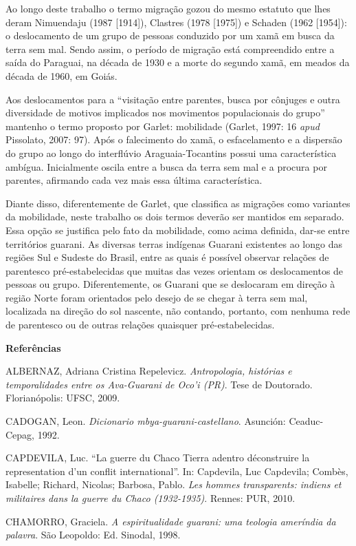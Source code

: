 Ao longo deste trabalho o termo migração gozou do mesmo estatuto que
lhes deram Nimuendaju (1987 {[}1914{]}), Clastres (1978 {[}1975{]}) e
Schaden (1962 {[}1954{]}): o deslocamento de um grupo de pessoas
conduzido por um xamã em busca da terra sem mal. Sendo assim, o período
de migração está compreendido entre a saída do Paraguai, na década de
1930 e a morte do segundo xamã, em meados da década de 1960, em Goiás.

Aos deslocamentos para a ``visitação entre parentes, busca por cônjuges
e outra diversidade de motivos implicados nos movimentos populacionais
do grupo'' mantenho o termo proposto por Garlet: mobilidade (Garlet,
1997: 16 \emph{apud} Pissolato, 2007: 97). Após o falecimento do xamã, o
esfacelamento e a dispersão do grupo ao longo do interflúvio
Araguaia-Tocantins possui uma característica ambígua. Inicialmente
oscila entre a busca da terra sem mal e a procura por parentes,
afirmando cada vez mais essa última característica.

Diante disso, diferentemente de Garlet, que classifica as migrações como
variantes da mobilidade, neste trabalho os dois termos deverão ser
mantidos em separado. Essa opção se justifica pelo fato da mobilidade,
como acima definida, dar-se entre territórios guarani. As diversas
terras indígenas Guarani existentes ao longo das regiões Sul e Sudeste
do Brasil, entre as quais é possível observar relações de parentesco
pré-estabelecidas que muitas das vezes orientam os deslocamentos de
pessoas ou grupo. Diferentemente, os Guarani que se deslocaram em
direção à região Norte foram orientados pelo desejo de se chegar à terra
sem mal, localizada na direção do sol nascente, não contando, portanto,
com nenhuma rede de parentesco ou de outras relações quaisquer
pré-estabelecidas.

\textbf{Referências}

ALBERNAZ, Adriana Cristina Repelevicz. \emph{Antropologia, histórias e
temporalidades entre os Ava-Guarani de Oco'i (PR)}. Tese de Doutorado.
Florianópolis: UFSC, 2009.

CADOGAN, Leon. \emph{Dicionario mbya-guarani-castellano}. Asunción:
Ceaduc- Cepag, 1992.

CAPDEVILA, Luc. ``La guerre du Chaco Tierra adentro déconstruire la
representation d'un conflit international''. In: Capdevila, Luc
Capdevila; Combès, Isabelle; Richard, Nicolas; Barbosa, Pablo. \emph{Les
hommes transparents: indiens et militaires dans la guerre du Chaco
(1932-1935)}. Rennes: PUR, 2010.

CHAMORRO, Graciela. \emph{A espiritualidade guarani: uma teologia
ameríndia da palavra}. São Leopoldo: Ed. Sinodal, 1998.

